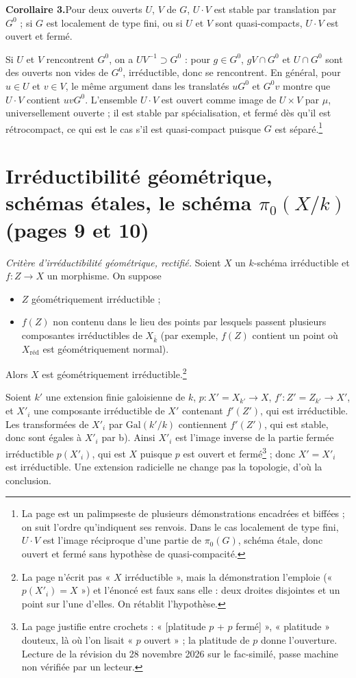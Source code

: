 \documentclass[11pt,a4paper]{article}
\begin{document}
\textbf{Corollaire 3.}\quad Pour deux ouverts $U$, $V$ de $G$, $U \cdot V$ est stable par translation par
$G^{0}$ ; si $G$ est localement de type fini, ou si $U$ et $V$ sont
quasi-compacts, $U \cdot V$ est ouvert et fermé.

Si $U$ et $V$ rencontrent $G^{0}$, on a $U V^{-1} \supset G^{0}$ : pour
$g \in G^{0}$, $g V \cap G^{0}$ et $U \cap G^{0}$ sont des ouverts non vides
de $G^{0}$, irréductible, donc se rencontrent. En général, pour $u \in U$ et
$v \in V$, le même argument dans les translatés $u G^{0}$ et $G^{0} v$ montre
que $U \cdot V$ contient $u v G^{0}$. L'ensemble $U \cdot V$ est ouvert comme
image de $U \times V$ par $\mu$, universellement ouverte ; il est stable par
spécialisation, et fermé dès qu'il est rétrocompact, ce qui est le cas s'il
est quasi-compact puisque $G$ est séparé.\footnote{La page est un palimpseste
de plusieurs démonstrations encadrées et biffées ; on suit l'ordre qu'indiquent
ses renvois. Dans le cas localement de type fini, $U \cdot V$ est l'image
réciproque d'une partie de $\pi_{0}(G)$, schéma étale, donc ouvert et
fermé sans hypothèse de quasi-compacité.}

\section*{Irréductibilité géométrique, schémas étales, le schéma $\pi_{0}(X/k)$ (pages 9 et 10)}

\emph{Critère d'irréductibilité géométrique, rectifié.} Soient $X$ un
$k$-schéma irréductible et $f \colon Z \to X$ un morphisme. On suppose
\begin{itemize}
\item[a)] $Z$ géométriquement irréductible ;
\item[b)] $f(Z)$ non contenu dans le lieu des points par lesquels passent
plusieurs composantes irréductibles de $X_{\bar k}$ (par exemple, $f(Z)$
contient un point où $X_{\mathrm{réd}}$ est géométriquement normal).
\end{itemize}
Alors $X$ est géométriquement irréductible.\footnote{La page n'écrit pas
« $X$ irréductible », mais la démonstration l'emploie (« $p(X'_{i}) = X$ ») et
l'énoncé est faux sans elle : deux droites disjointes et un point sur l'une
d'elles. On rétablit l'hypothèse.}

Soient $k'$ une extension finie galoisienne de $k$, $p \colon X' = X_{k'} \to X$,
$f' \colon Z' = Z_{k'} \to X'$, et $X'_{i}$ une composante irréductible de $X'$
contenant $f'(Z')$, qui est irréductible. Les transformées de $X'_{i}$ par
$\mathrm{Gal}(k'/k)$ contiennent $f'(Z')$, qui est stable, donc sont égales à
$X'_{i}$ par b). Ainsi $X'_{i}$ est l'image inverse de la partie fermée
irréductible $p(X'_{i})$, qui est $X$ puisque $p$ est ouvert et
fermé\footnote{La page justifie entre crochets : « [platitude $p$ + $p$
fermé] », « platitude » douteux, là où l'on lisait « $p$ ouvert » ; la platitude
de $p$ donne l'ouverture. Lecture de la révision du 28 novembre 2026 sur le
fac-similé, passe machine non vérifiée par un lecteur.} ; donc
$X' = X'_{i}$ est irréductible. Une extension radicielle ne change pas la
topologie, d'où la conclusion.
\end{document}
